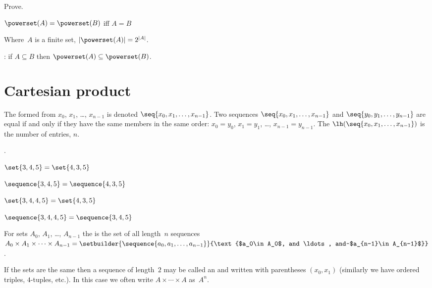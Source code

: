 \documentclass{ibl}
\begin{document}
\begin{ex} Prove.
\begin{exes}
\item $\powerset(A)=\powerset(B)$ iff $A= B$  
\item Where~$A$ is a finite set, $|\powerset(A)|=2^{|A|}$.    
\end{exes}
\end{ex}

\begin{ex} \pord:
if $A\subseteq B$ then $\powerset(A)\subseteq\powerset(B)$.  
\end{ex}




\section{Cartesian product}

\begin{df}
The  
formed from $x_0$, $x_1$, \ldots, $x_{n-1}$ is
denoted $\seq{x_0, x_1, \ldots, x_{n-1}}$.
Two sequences $\seq{x_0, x_1, \ldots, x_{n-1}}$ and
$\seq{y_0, y_1, \ldots, y_{n-1}}$ are equal if and only if
they have the same members in the same order:
$x_0=y_0$, $x_1=y_1$, \ldots, $x_{n-1}=y_{n-1}$. 
The  $\lh(\seq{x_0, x_1, \ldots, x_{n-1}})$
is the number of entries, $n$.
\end{df}

\begin{ex}\pord.
\begin{exes}
\item $\set{3, 4, 5}=\set{4, 3, 5}$
\item $\sequence{3, 4, 5}=\sequence{4, 3, 5}$
\item $\set{3, 4, 4, 5}=\set{4, 3, 5}$
\item $\sequence{3, 4,4,5}=\sequence{3,4,5}$  
\end{exes}
\end{ex}

\begin{df}
For sets $A_0$, $A_1$, \ldots, $A_{n-1}$ the 
is the set of all length~$n$ sequences
$A_0\times A_1\times \cdots \times A_{n-1}
  =\setbuilder{\sequence{a_0,a_1,\ldots,a_{n-1}}}{\text{$a_0\in A_0$, and \ldots, and~$a_{n-1}\in A_{n-1}$}}$.

If the sets are the same then 
a sequence of length~$2$ may be called an  and 
written with parentheses $(x_0,x_1)$
(similarly we have ordered triples, $4$-tuples, etc.).
In this case we often write $A\times\cdots\times A$ 
as~$A^n$.
\end{df}
\end{document}
